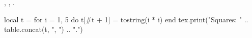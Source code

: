 \documentclass{article}
\begin{document}
, , .
\begin{luacode*}
  local t = {}
  for i = 1, 5 do t[#t + 1] = tostring(i * i) end
  tex.print("Squares: " .. table.concat(t, ", ") .. ".")
\end{luacode*}
\end{document}
